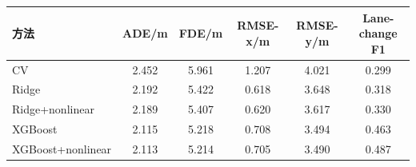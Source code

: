 \begin{tabular}{lccccc}
\toprule
方法 & ADE/m & FDE/m & RMSE-x/m & RMSE-y/m & Lane-change F1 \\ 
\midrule
CV & 2.452 & 5.961 & 1.207 & 4.021 & 0.299 \\ 
Ridge & 2.192 & 5.422 & 0.618 & 3.648 & 0.318 \\ 
Ridge+nonlinear & 2.189 & 5.407 & 0.620 & 3.617 & 0.330 \\ 
XGBoost & 2.115 & 5.218 & 0.708 & 3.494 & 0.463 \\ 
XGBoost+nonlinear & 2.113 & 5.214 & 0.705 & 3.490 & 0.487 \\ 
\bottomrule
\end{tabular}
